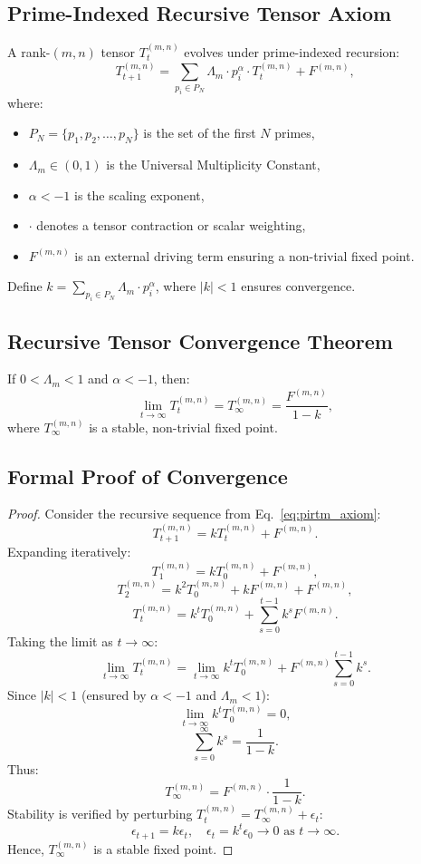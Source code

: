 \documentclass{article}
\theoremstyle{plain}
\begin{document}
\subsection{Prime-Indexed Recursive Tensor Axiom}
A rank-$(m,n)$ tensor \( T_t^{(m,n)} \) evolves under prime-indexed recursion:
\begin{equation}
T_{t+1}^{(m,n)} = \sum_{p_i \in P_N} \Lambda_m \cdot p_i^\alpha \cdot T_t^{(m,n)} + F^{(m,n)},
\label{eq:pirtm_axiom}
\end{equation}
where:
\begin{itemize}
    \item \( P_N = \{p_1, p_2, \dots, p_N\} \) is the set of the first \( N \) primes,
    \item \( \Lambda_m \in (0, 1) \) is the Universal Multiplicity Constant,
    \item \( \alpha < -1 \) is the scaling exponent,
    \item \( \cdot \) denotes a tensor contraction or scalar weighting,
    \item \( F^{(m,n)} \) is an external driving term ensuring a non-trivial fixed point.
\end{itemize}
Define \( k = \sum_{p_i \in P_N} \Lambda_m \cdot p_i^\alpha \), where \( |k| < 1 \) ensures convergence.

 \subsection{Recursive Tensor Convergence Theorem}
If \( 0 < \Lambda_m < 1 \) and \( \alpha < -1 \), then:
\begin{equation}
\lim_{t \to \infty} T_t^{(m,n)} = T_\infty^{(m,n)} = \frac{F^{(m,n)}}{1 - k},
\label{eq:pirtm_theorem}
\end{equation}
where \( T_\infty^{(m,n)} \) is a stable, non-trivial fixed point.

 \subsection{Formal Proof of Convergence}
\begin{proof}
Consider the recursive sequence from Eq.~\eqref{eq:pirtm_axiom}:
\[
T_{t+1}^{(m,n)} = k T_t^{(m,n)} + F^{(m,n)}.
\]
Expanding iteratively:
\[
T_1^{(m,n)} = k T_0^{(m,n)} + F^{(m,n)},
\]
\[
T_2^{(m,n)} = k^2 T_0^{(m,n)} + k F^{(m,n)} + F^{(m,n)},
\]
\[
T_t^{(m,n)} = k^t T_0^{(m,n)} + \sum_{s=0}^{t-1} k^s F^{(m,n)}.
\]
Taking the limit as \( t \to \infty \):
\[
\lim_{t \to \infty} T_t^{(m,n)} = \lim_{t \to \infty} k^t T_0^{(m,n)} + F^{(m,n)} \sum_{s=0}^{t-1} k^s.
\]
Since \( |k| < 1 \) (ensured by \( \alpha < -1 \) and \( \Lambda_m < 1 \)):
\[
\lim_{t \to \infty} k^t T_0^{(m,n)} = 0,
\]
\[
\sum_{s=0}^\infty k^s = \frac{1}{1 - k}.
\]
Thus:
\[
T_\infty^{(m,n)} = F^{(m,n)} \cdot \frac{1}{1 - k}.
\]
Stability is verified by perturbing \( T_t^{(m,n)} = T_\infty^{(m,n)} + \epsilon_t \):
\[
\epsilon_{t+1} = k \epsilon_t, \quad \epsilon_t = k^t \epsilon_0 \to 0 \text{ as } t \to \infty.
\]
Hence, \( T_\infty^{(m,n)} \) is a stable fixed point.
\end{proof}
\end{document}
